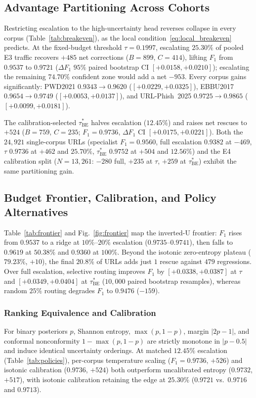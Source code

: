 \documentclass[conference,a4paper]{IEEEtran}
\begin{document}
\subsection{Advantage Partitioning Across Cohorts}
Restricting escalation to the high-uncertainty head reverses collapse in every
corpus (Table~\ref{tab:breakeven}), as the local condition~\eqref{eq:local_breakeven}
predicts. At the fixed-budget threshold $\tau=0.1997$,
escalating $25.30\%$ of pooled E3 traffic recovers $+485$ net corrections ($B=899$,
$C=414$), lifting $F_1$ from $0.9537$ to $0.9721$ ($\Delta F_1$ $95\%$ paired bootstrap CI
$[+0.0158,+0.0210]$); escalating the remaining $74.70\%$ confident zone would add a net $-953$. Every corpus gains significantly: PWD2021 $0.9343\to0.9620$
($[+0.0229,+0.0325]$), EBBU2017 $0.9654\to0.9749$ ($[+0.0053,+0.0137]$), and
URL-Phish~2025 $0.9725\to0.9865$ ($[+0.0099,+0.0181]$).

The calibration-selected $\tau^{\ast}_{\mathrm{BE}}$ halves escalation ($12.45\%$)
and raises net rescues to $+524$ ($B=759$, $C=235$; $F_1=0.9736$, $\Delta F_1$ CI
$[+0.0175,+0.0221]$). Both the $24{,}921$ single-corpus URLs (specialist
$F_1=0.9560$, full escalation $0.9382$ at $-469$, $\tau$ $0.9736$ at $+462$ and
$25.70\%$, $\tau^{\ast}_{\mathrm{BE}}$ $0.9752$ at $+504$ and $12.56\%$) and the E4
calibration split ($N=13{,}261$: $-280$ full, $+235$ at $\tau$, $+259$ at
$\tau^{\ast}_{\mathrm{BE}}$) exhibit the same partitioning gain.

\subsection{Budget Frontier, Calibration, and Policy Alternatives}
Table~\ref{tab:frontier} and Fig.~\ref{fig:frontier} map the inverted-U frontier:
$F_1$ rises from $0.9537$ to a ridge at $10\%$--$20\%$ escalation
($0.9735$--$0.9741$), then falls to $0.9619$ at $50.38\%$ and $0.9360$ at $100\%$. Beyond the isotonic zero-entropy
plateau ($79.23\%$, $+10$), the final $20.8\%$ of URLs adds just $1$ rescue against
$479$ regressions. Over full escalation, selective routing improves $F_1$ by
$[+0.0338,+0.0387]$ at $\tau$ and $[+0.0349,+0.0404]$ at $\tau^{\ast}_{\mathrm{BE}}$
($10{,}000$ paired bootstrap resamples), whereas random $25\%$ routing degrades $F_1$
to $0.9476$ ($-159$).

\subsubsection{Ranking Equivalence and Calibration}
For binary posteriors $p$, Shannon entropy, $\max(p,1-p)$, margin $|2p-1|$, and
conformal nonconformity $1-\max(p,1-p)$ are strictly monotone in $|p-0.5|$ and
induce identical uncertainty orderings.
At matched $12.45\%$ escalation (Table~\ref{tab:policies}), per-corpus temperature
scaling ($F_1=0.9736$, $+526$) and isotonic calibration ($0.9736$, $+524$) both
outperform uncalibrated entropy ($0.9732$, $+517$), with isotonic calibration
retaining the edge at $25.30\%$ ($0.9721$ vs.\ $0.9716$ and $0.9713$).
\end{document}
